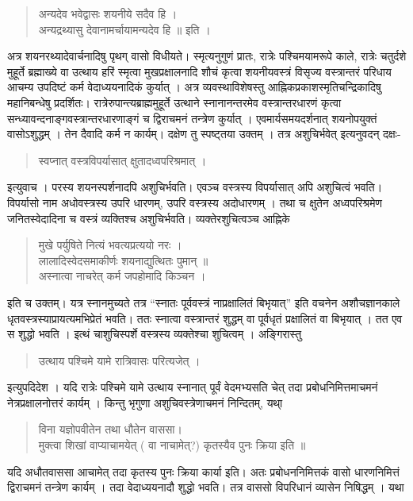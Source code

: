 \begin{verse}
अन्यदेव भवेद्वासः शयनीये सदैव हि ।\\
अन्यद्रथ्यासु देवानामर्चायामन्यदेव हि ॥ इति ।
\end{verse}
अत्र शयनरथ्यादेवार्चनादिषु  पृथग् वासो विधीयते। स्मृत्यनुगुणं प्रातः, रात्रेः पश्चिमयामरूपे काले, रात्रेः चतुर्दशे मुहूर्ते ब्रह्माख्ये वा उत्थाय हरिं स्मृत्वा मुखप्रक्षालनादि शौचं कृत्वा शयनीयवस्त्रं विसृज्य वस्त्रान्तरं परिधाय आचम्य उपदिष्टं कर्म वेदाध्ययनादिकं कुर्यात् । अत्र व्यवस्थाविशेषस्तु आह्निकप्रकाशस्मृतिचन्द्रिकादिषु महानिबन्धेषु प्रदर्शितः। रात्रेरुपान्त्यब्राह्ममुहूर्ते उत्थाने स्नानानन्तरमेव वस्त्रान्तरधारणं कृत्वा सन्ध्यावन्दनाङ्गवस्त्रान्तरधारणाङ्गं च द्विराचमनं तन्त्रेण कुर्यात् । एवमार्यसमयदर्शनात् शयनोपयुक्तं वासोऽशुद्धम् । तेन दैवादि कर्म न कार्यम्। दक्षेण तु स्पष्ट्तया उक्तम् । तत्र अशुचिर्भवेत् इत्यनुवदन् दक्षः- 
\begin{verse}
स्वप्नात् वस्त्रविपर्यासात् क्षुतादध्वपरिश्रमात् । 
\end{verse}
इत्युवाच । परस्य शयनस्पर्शनादपि अशुचिर्भवति। एवञ्च वस्त्रस्य विपर्यासात् अपि अशुचित्वं भवति। विपर्यासो नाम अधोवस्त्रस्य उपरि धारणम्, उपरि वस्त्रस्य अदोधारणम् । तथा च क्षुतेन अध्वपरिश्रमेण जनितस्वेदादिना च वस्त्रं व्यक्तिश्च अशुचिर्भवति। व्यक्तेरशुचित्वञ्च आह्निके 
\begin{verse}
मुखे पर्युषिते नित्यं भवत्यप्रत्ययो नरः । \\
लालादिस्वेदसमाकीर्णः शयनाद्युत्थितः पुमान् ॥\\
अस्नात्वा नाचरेत् कर्म जपहोमादि किञ्चन ।
\end{verse}
इति च उक्तम्। यत्र स्नानमुच्यते तत्र “स्नातः पूर्ववस्त्रं नाप्रक्षालितं बिभृयात्” इति वचनेन अशौचज्ञानकाले धृतवस्त्रस्याप्रायत्यमभिप्रेतं भवति। ततः स्नात्वा वस्त्रान्तरं शुद्धम् वा पूर्वधृतं प्रक्षालितं वा बिभृयात् । तत एव स शुद्धो भवति । इत्थं चाशुचिस्पर्शे वस्त्रस्य व्यक्तेश्चा शुचित्वम् । अङ्गिरास्तु 
\begin{verse}
उत्थाय पश्चिमे यामे रात्रिवासः परित्यजेत्  ।
\end{verse}
इत्युपदिदेश । यदि रात्रेः पश्चिमे यामे उत्थाय स्नानात् पूर्वं वेदमभ्यसति चेत् तदा प्रबोधनिमित्तमाचमनं नेत्रप्रक्षालनोत्तरं कार्यम् । किन्तु भृगुणा अशुचिवस्त्रेणाचमनं निन्दितम्, यथा् \
\begin{verse}
विना यज्ञोपवीतेन तथा धौतेन वाससा। \\
मुक्त्वा शिखां वाप्याचामयेत् ( वा नाचामेत्?) कृतस्यैव पुनः क्रिया इति ॥ 
\end{verse}
यदि अधौतवाससा आचामेत् तदा कृतस्य पुनः क्रिया कार्या इति। अतः प्रबोधननिमित्तकं वासो धारणनिमित्तं द्विराचमनं तन्त्रेण कार्यम् । तदा वेदाध्ययनादौ शुद्धो भवति। तत्र वाससो विपरिधानं व्यासेन निषिद्धम् । यथा \
